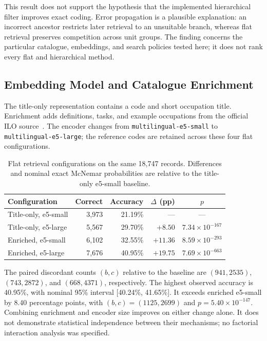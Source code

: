 This result does not support the hypothesis that the implemented
hierarchical filter improves exact coding. Error propagation is a plausible
explanation: an incorrect ancestor restricts later retrieval to an unsuitable
branch, whereas flat retrieval preserves competition across unit groups.
The finding concerns the particular catalogue, embeddings, and search
policies tested here; it does not rank every flat and hierarchical method.

\subsection{Embedding Model and Catalogue Enrichment}

The title-only representation contains a code and short occupation title.
Enrichment adds definitions, tasks, and example occupations from the official
ILO source~\cite{ilo2012isco_v1}. The encoder changes from
\texttt{multilingual-e5-small} to \texttt{multilingual-e5-large}; the
reference codes are retained across these four flat configurations.

\begin{table}[htbp]
\centering
\caption{Flat retrieval configurations on the same 18,747 records.
Differences and nominal exact McNemar probabilities are relative to the
title-only e5-small baseline.}
\label{tab:ch6-additive}
\small\renewcommand{\arraystretch}{1.3}
\begin{tabular}{lrrrc}
\toprule
\textbf{Configuration} & \textbf{Correct} & \textbf{Accuracy} & \textbf{$\Delta$ (pp)} & \textbf{$p$} \\
\midrule
Title-only, e5-small & 3,973 & 21.19\% & --- & --- \\
Title-only, e5-large & 5,567 & 29.70\% & $+8.50$ & $7.34\times10^{-167}$ \\
Enriched, e5-small & 6,102 & 32.55\% & $+11.36$ & $8.59\times10^{-293}$ \\
Enriched, e5-large & 7,676 & 40.95\% & $+19.75$ & $7.69\times10^{-663}$ \\
\bottomrule
\end{tabular}
\end{table}

The paired discordant counts $(b,c)$ relative to the baseline are
$(941,2535)$, $(743,2872)$, and $(668,4371)$, respectively. The highest
observed accuracy is 40.95\%, with nominal 95\% interval [40.24\%, 41.65\%].
It exceeds enriched e5-small by 8.40 percentage points, with
$(b,c)=(1125,2699)$ and $p=5.40\times10^{-147}$. Combining enrichment and
encoder size improves on either change alone. It does not demonstrate
statistical independence between their mechanisms; no factorial interaction
analysis was specified.

